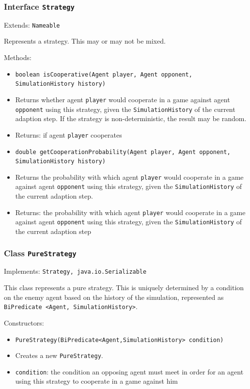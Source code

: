 \documentclass[parskip=full,11pt]{scrartcl}
\begin{document}
\subsubsection{Interface \texttt{Strategy}}
Extends: \texttt{Nameable}

Represents a strategy. This may or may not be mixed.

Methods:
\begin{itemize}\itemsep -10pt
\item \texttt{boolean isCooperative(Agent player, Agent opponent, SimulationHistory history)}
\item[] Returns whether agent \texttt{player} would cooperate in a game against agent \texttt{opponent} using this strategy, given the \texttt{SimulationHistory} of the current adaption step. If the strategy is non-deterministic, the result may be random.
\item[] Returns: if agent \texttt{player} cooperates

\item \texttt{double getCooperationProbability(Agent player, Agent opponent, SimulationHistory history)}
\item[] Returns the probability with which agent \texttt{player} would cooperate in a game against agent \texttt{opponent} using this strategy, given the \texttt{SimulationHistory} of the current adaption step.
\item[] Returns: the probability with which agent \texttt{player} would cooperate in a game against agent \texttt{opponent} using this strategy, given the \texttt{SimulationHistory} of the current adaption step
\end{itemize}

\subsubsection{Class \texttt{PureStrategy}}
Implements: \texttt{Strategy, java.io.Serializable}

This class represents a pure strategy. This is uniquely determined by a condition on the enemy agent based on the history of the simulation, represented as \texttt{BiPredicate <Agent, SimulationHistory>}.

Constructors:
\begin{itemize}\itemsep -10pt
\item \texttt{PureStrategy(BiPredicate<Agent,SimulationHistory> condition)}
\item[] Creates a new \texttt{PureStrategy}.
\item[] \texttt{condition}: the condition an opposing agent must meet in order for an agent using this strategy to cooperate in a game against him
\end{itemize}
\end{document}
